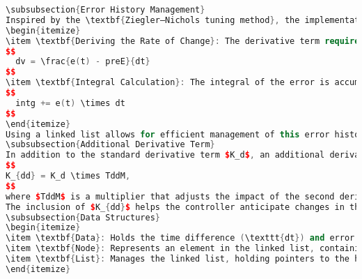 \documentclass[a4paper,12pt]{article}
\begin{document}
\begin{lstlising}[language=C++]
\begin{lstlisting}[language=C++]
\subsubsection{Error History Management}
Inspired by the \textbf{Ziegler–Nichols tuning method}, the implementation maintains a history of past errors and their timestamps to calculate the derivative and integral terms accurately. This history management is crucial for two main reasons:
\begin{itemize}
\item \textbf{Deriving the Rate of Change}: The derivative term requires knowledge of how fast the error is changing. By storing previous error values in a linked list, we can accurately compute the change in error over time ($\frac{de(t)}{dt}$):
$$
  dv = \frac{e(t) - preE}{dt}
$$
\item \textbf{Integral Calculation}: The integral of the error is accumulated over time, enabling the controller to respond to persistent deviations from the setpoint:
$$
  intg += e(t) \times dt
$$
\end{itemize}
Using a linked list allows for efficient management of this error history. As new errors are added, older entries can be pruned to ensure that only relevant data is retained, which helps avoid excessive memory usage and keeps the calculations focused on the most recent behavior of the system.
\subsubsection{Additional Derivative Term}
In addition to the standard derivative term $K_d$, an additional derivative term $K_{dd}$ is included in the PID controller. This term represents a second derivative component, which can be defined as follows:
$$
K_{dd} = K_d \times TddM,
$$
where $TddM$ is a multiplier that adjusts the impact of the second derivative term. \\
The inclusion of $K_{dd}$ helps the controller anticipate changes in the error more effectively. By accounting for the acceleration of the error (i.e., how the rate of error change is itself changing), this additional term enhances the damping characteristics of the controller, allowing for more refined control responses, especially in systems that are subject to rapid changes or oscillations.
\subsubsection{Data Structures}
\begin{itemize}
\item \textbf{Data}: Holds the time difference (\texttt{dt}) and error value (\texttt{e}).
\item \textbf{Node}: Represents an element in the linked list, containing \texttt{Data} and a pointer to the previous node.
\item \textbf{List}: Manages the linked list, holding pointers to the head and tail nodes and the size of the list.
\end{itemize}

\end{lstlisting}
\end{lstlising}
\end{document}
